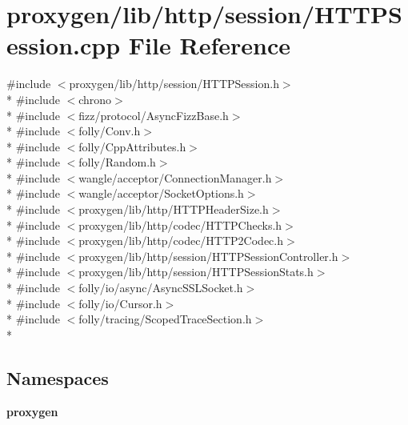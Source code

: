 \section{proxygen/lib/http/session/\+H\+T\+T\+P\+Session.cpp File Reference}
\label{HTTPSession_8cpp}
{\ttfamily \#include $<$proxygen/lib/http/session/\+H\+T\+T\+P\+Session.\+h$>$}\\*
{\ttfamily \#include $<$chrono$>$}\\*
{\ttfamily \#include $<$fizz/protocol/\+Async\+Fizz\+Base.\+h$>$}\\*
{\ttfamily \#include $<$folly/\+Conv.\+h$>$}\\*
{\ttfamily \#include $<$folly/\+Cpp\+Attributes.\+h$>$}\\*
{\ttfamily \#include $<$folly/\+Random.\+h$>$}\\*
{\ttfamily \#include $<$wangle/acceptor/\+Connection\+Manager.\+h$>$}\\*
{\ttfamily \#include $<$wangle/acceptor/\+Socket\+Options.\+h$>$}\\*
{\ttfamily \#include $<$proxygen/lib/http/\+H\+T\+T\+P\+Header\+Size.\+h$>$}\\*
{\ttfamily \#include $<$proxygen/lib/http/codec/\+H\+T\+T\+P\+Checks.\+h$>$}\\*
{\ttfamily \#include $<$proxygen/lib/http/codec/\+H\+T\+T\+P2\+Codec.\+h$>$}\\*
{\ttfamily \#include $<$proxygen/lib/http/session/\+H\+T\+T\+P\+Session\+Controller.\+h$>$}\\*
{\ttfamily \#include $<$proxygen/lib/http/session/\+H\+T\+T\+P\+Session\+Stats.\+h$>$}\\*
{\ttfamily \#include $<$folly/io/async/\+Async\+S\+S\+L\+Socket.\+h$>$}\\*
{\ttfamily \#include $<$folly/io/\+Cursor.\+h$>$}\\*
{\ttfamily \#include $<$folly/tracing/\+Scoped\+Trace\+Section.\+h$>$}\\*
\subsection*{Namespaces}
\begin{DoxyCompactItemize}
\item 
 {\bf proxygen}
\end{DoxyCompactItemize}
